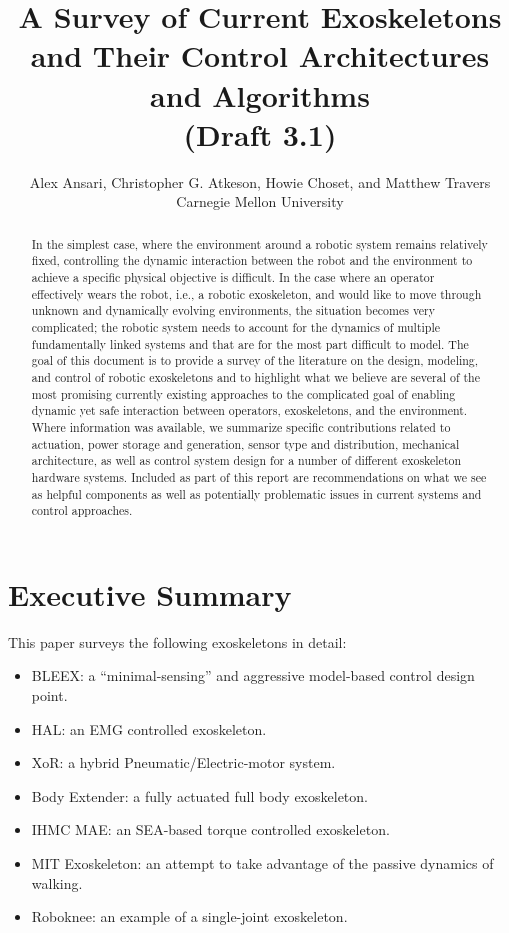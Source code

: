 \documentclass[letterpaper,12pt,fullpage]{article}
\begin{document}
\title{A Survey of Current Exoskeletons and Their Control Architectures and
Algorithms\\
(Draft 3.1)}

\author{Alex Ansari, Christopher G. Atkeson, Howie Choset, and Matthew Travers\\
Carnegie Mellon University}

\maketitle

\begin{abstract}
In the simplest case, where the environment around a robotic system remains relatively fixed, controlling the dynamic interaction between the robot and the environment to achieve a specific physical objective is difficult.  In the case where an operator effectively wears the robot, i.e., a robotic exoskeleton, and would like to move through unknown and dynamically evolving environments, the situation becomes very complicated; the robotic system needs to account for the dynamics of multiple fundamentally linked systems and that are for the most part difficult to model.  The goal of this document is to provide a survey of the literature on the design, modeling, and control of robotic exoskeletons and to highlight what we believe are several of the most promising currently existing approaches to the complicated goal of enabling dynamic yet safe interaction between operators, exoskeletons, and the environment.  Where information was available, we summarize specific contributions related to actuation, power storage and generation, sensor type and distribution, mechanical architecture, as well as control system design for a number of different exoskeleton hardware systems.  Included as part of this report are recommendations on what we see as helpful components as well as potentially problematic issues in current systems and control approaches. 
\end{abstract}

\section{Executive Summary}

This paper surveys the following exoskeletons in detail:
\begin{itemize}
\item
BLEEX: a ``minimal-sensing'' and aggressive model-based control design point.
\item
HAL: an EMG controlled exoskeleton.
\item
XoR: a hybrid Pneumatic/Electric-motor system.
\item
Body Extender: a fully actuated full body exoskeleton.
\item
IHMC MAE: an SEA-based torque controlled exoskeleton.
\item
MIT Exoskeleton: an attempt to take advantage of the passive dynamics
of walking.
\item
Roboknee: an example of a single-joint exoskeleton.
\end{itemize}
\end{document}
